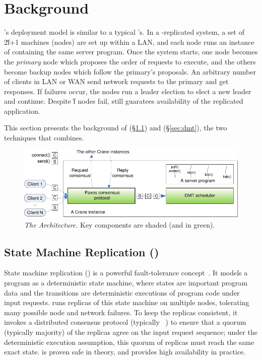 \section{\repbox Background} \label{sec:background}

\repbox's deployment model is similar to a typical \smr's. In a \repbox-replicated
system, a set of 2\v{f}+1 machines (nodes) are set up within a LAN,
and each node runs an instance of \repbox containing the same server
program. Once the \repbox system starts, one node becomes the \emph{primary}
node which proposes the order of requests to execute, and the others
become backup nodes which follow the primary's proposals. An arbitrary
number of clients in LAN or WAN send network requests to the primary and
get responses.  If failures occur, the nodes run a leader election to
elect a new leader and continue. Despite \v{f} nodes fail, \repbox still 
guaratees availability of the replicated application.

This section presents the background of \smr (\S\ref{sec:smr}) and \dmt 
(\S\ref{sec:dmt}), the two techniques that \repbox combines. 


\begin{figure}[t]
\vspace{.20in}
\centering
\includegraphics[width=.47\textwidth]{figures/arch}
\vspace{.06in}
\caption{{\em The \repbox Architecture.} Key components are shaded (and in
  green).} \label{fig:repbox}
\vspace{-.05in}
\end{figure}


\subsection{State Machine Replication (\smr)} \label{sec:smr}

State machine replication (\smr) is a powerful fault-tolerance
concept~\cite{paxos:practical}.  It models a program as a deterministic state 
machine, where states are important program data and the transitions are 
deterministic executions of program code under input requests.  \smr runs 
replicas of this state machine on multiple nodes, tolerating many possible node 
and network failures.  To keep the replicas consistent, it invokes a
distributed consensus protocol (typically \paxos~\cite{paxos, paxos:simple, 
paxos:practical}) to ensure that a quorum (typically majority) of the replicas 
agree on the input request sequence; under the deterministic execution 
assumption, this quorum of replicas must reach the same exact state.  \smr is 
proven safe in theory, and provides high availability in practice.

